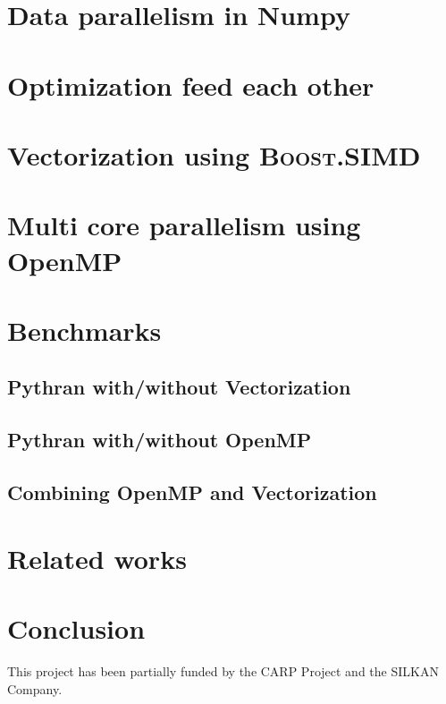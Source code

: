 \documentclass[10pt, onecolumn, preprint]{sigplanconf}
\providecommand{\boostsimd}{\textsc{Boost.SIMD}}
\begin{document}
\section{Data parallelism in Numpy}
\label{sec:numpy}

\section{Optimization feed each other}
\label{sec:optim}

\section{Vectorization using \boostsimd}
\label{sec:SIMD}

\section{Multi core parallelism using OpenMP}
\label{sec:omp}

\section{Benchmarks}
\label{sec:perfs}

\subsection{Pythran with/without Vectorization}

\subsection{Pythran with/without OpenMP}

\subsection{Combining OpenMP and Vectorization}


\section{Related works}
\label{sec:related-work}


\section*{Conclusion}

\acks

This project has been partially funded by the CARP Project and the SILKAN
Company.




\end{document}
